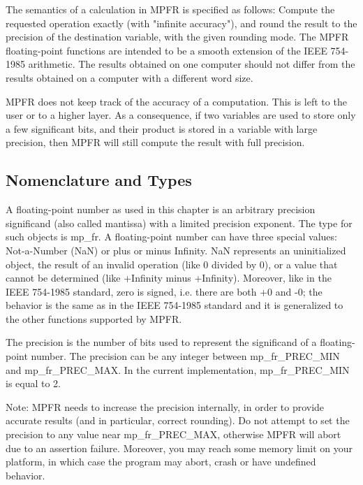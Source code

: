 \vspace{0.3cm}
The semantics of a calculation in MPFR is specified as follows: Compute the requested operation exactly (with "infinite accuracy"), and round the result to the precision of the destination variable, with the given rounding mode. The MPFR floating-point functions are intended to be a smooth extension of the IEEE 754-1985 arithmetic. The results obtained on one computer should not differ from the results obtained on a computer with a different word size. 

\vspace{0.3cm}
MPFR does not keep track of the accuracy of a computation. This is left to the user or to a higher layer. As a consequence, if two variables are used to store only a few significant bits, and their product is stored in a variable with large precision, then MPFR will still compute the result with full precision. 



\subsection{Nomenclature and Types}

A floating-point number as used in this chapter is an arbitrary precision significand (also called mantissa) with a limited precision exponent. The type for such objects is mp\_fr. A floating-point number can have three special values: Not-a-Number (NaN) or plus or minus Infinity. NaN represents an uninitialized object, the result of an invalid operation (like 0 divided by 0), or a value that cannot be determined (like +Infinity minus +Infinity). Moreover, like in the IEEE 754-1985 standard, zero is signed, i.e. there are both +0 and -0; the behavior is the same as in the IEEE 754-1985 standard and it is generalized to the other functions supported by MPFR. 

\vspace{0.3cm}
The precision is the number of bits used to represent the significand of a floating-point number. The precision can be any integer between mp\_fr\_PREC\_MIN and mp\_fr\_PREC\_MAX. In the current implementation, mp\_fr\_PREC\_MIN is equal to 2. 

\vspace{0.3cm}
Note: MPFR needs to increase the precision internally, in order to provide accurate results (and in particular, correct rounding). Do not attempt to set the precision to any value near mp\_fr\_PREC\_MAX, otherwise MPFR will abort due to an assertion failure. Moreover, you may reach some memory limit on your platform, in which case the program may abort, crash or have undefined behavior. 

